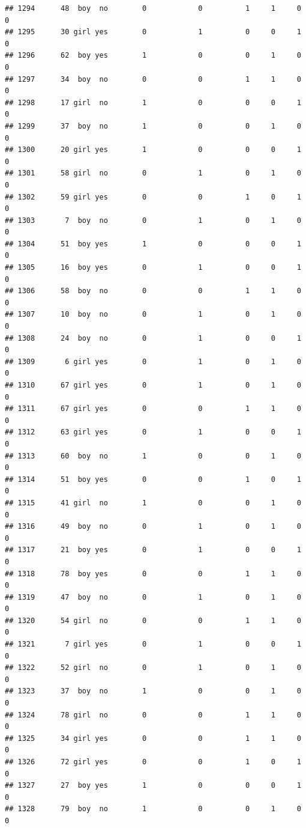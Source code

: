 \documentclass[man]{apa6}
\begin{document}
\begin{verbatim}
## 1294      48  boy  no        0            0          1     1     0     0
## 1295      30 girl yes        0            1          0     0     1     0
## 1296      62  boy yes        1            0          0     1     0     0
## 1297      34  boy  no        0            0          1     1     0     0
## 1298      17 girl  no        1            0          0     0     1     0
## 1299      37  boy  no        1            0          0     1     0     0
## 1300      20 girl yes        1            0          0     0     1     0
## 1301      58 girl  no        0            1          0     1     0     0
## 1302      59 girl yes        0            0          1     0     1     0
## 1303       7  boy  no        0            1          0     1     0     0
## 1304      51  boy yes        1            0          0     0     1     0
## 1305      16  boy yes        0            1          0     0     1     0
## 1306      58  boy  no        0            0          1     1     0     0
## 1307      10  boy  no        0            1          0     1     0     0
## 1308      24  boy  no        0            1          0     0     1     0
## 1309       6 girl yes        0            1          0     1     0     0
## 1310      67 girl yes        0            1          0     1     0     0
## 1311      67 girl yes        0            0          1     1     0     0
## 1312      63 girl yes        0            1          0     0     1     0
## 1313      60  boy  no        1            0          0     1     0     0
## 1314      51  boy yes        0            0          1     0     1     0
## 1315      41 girl  no        1            0          0     1     0     0
## 1316      49  boy  no        0            1          0     1     0     0
## 1317      21  boy yes        0            1          0     0     1     0
## 1318      78  boy yes        0            0          1     1     0     0
## 1319      47  boy  no        0            1          0     1     0     0
## 1320      54 girl  no        0            0          1     1     0     0
## 1321       7 girl yes        0            1          0     0     1     0
## 1322      52 girl  no        0            1          0     1     0     0
## 1323      37  boy  no        1            0          0     1     0     0
## 1324      78 girl  no        0            0          1     1     0     0
## 1325      34 girl yes        0            0          1     1     0     0
## 1326      72 girl yes        0            0          1     0     1     0
## 1327      27  boy yes        1            0          0     0     1     0
## 1328      79  boy  no        1            0          0     1     0     0

\end{verbatim}
\end{document}
